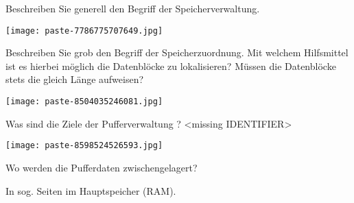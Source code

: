 \documentclass{article}
\begin{document}
\begin{tcolorbox}[colback=white!10!white,colframe=lightgray!75!black,
  savelowerto=\jobname_ex.tex]

\begin{center}
 Beschreiben Sie generell den Begriff der Speicherverwaltung. 

\end{center}

\tcblower

\justifying
\texttt{[image: paste-7786775707649.jpg]}

\end{tcolorbox}
\begin{tcolorbox}[colback=white!10!white,colframe=lightgray!75!black,
  savelowerto=\jobname_ex.tex]

\begin{center}
 Beschreiben Sie grob den Begriff der Speicherzuordnung. Mit welchem Hilfsmittel ist es hierbei möglich die Datenblöcke zu lokalisieren? Müssen die Datenblöcke stets die gleich Länge aufweisen? 

\end{center}

\tcblower

\justifying
\texttt{[image: paste-8504035246081.jpg]}

\end{tcolorbox}
\begin{tcolorbox}[colback=white!10!white,colframe=lightgray!75!black,
  savelowerto=\jobname_ex.tex]

\begin{center}
 Was sind die Ziele der 
Pufferverwaltung
? <missing IDENTIFIER>

\end{center}

\tcblower

\justifying
\texttt{[image: paste-8598524526593.jpg]}

\end{tcolorbox}
\begin{tcolorbox}[colback=white!10!white,colframe=lightgray!75!black,
  savelowerto=\jobname_ex.tex]

\begin{center}
 Wo werden die Pufferdaten zwischengelagert? 

\end{center}

\tcblower

\justifying
In sog. 
Seiten
im Hauptspeicher (RAM).

\end{tcolorbox}
\end{document}
